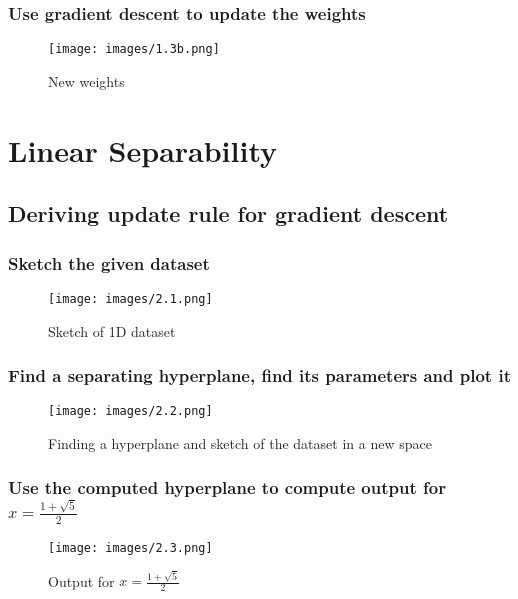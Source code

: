 \documentclass{article}
\begin{document}
    
\subsubsection{Use gradient descent to update the weights}
    \begin{figure}[H]
        \centering
        \texttt{[image: images/1.3b.png]}
        \caption{New weights}
        \label{fig:1.3b}
    \end{figure}


\section{Linear Separability}

\subsection{Deriving update rule for gradient descent }

\subsubsection{Sketch the given dataset}
    
    \begin{figure}[H]
        \centering
        \texttt{[image: images/2.1.png]}
        \caption{Sketch of 1D dataset}
        \label{fig:2.1}
    \end{figure}

\subsubsection{Find a separating hyperplane, find its parameters and plot it}
    \begin{figure}[H]
        \centering
        \texttt{[image: images/2.2.png]}
        \caption{Finding a hyperplane and sketch of the dataset in a new space}
        \label{fig:2.2}
    \end{figure}

\subsubsection{Use the computed hyperplane to compute output for $x=\frac{1+\sqrt{5}}{2}$}
    \begin{figure}[H]
        \centering
        \texttt{[image: images/2.3.png]}
        \caption{Output for $x=\frac{1+\sqrt{5}}{2}$}
        \label{fig:2.3}
    \end{figure}
\end{document}
